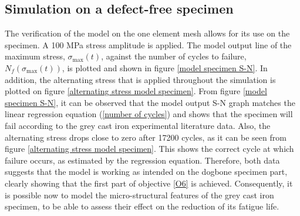 \documentclass[11pt,a4paper]{article}
\begin{document}
\subsection{Simulation on a defect-free specimen}
The verification of the model on the one element mesh allows for its use on the specimen. A 100 MPa stress amplitude is applied. The model output line of the maximum stress,  $\sigma_{\textrm{max}}(t)$,  against the number of cycles to failure, $N_f(\sigma_{\textrm{max}}(t))$, is plotted and shown in figure \ref{model specimen S-N}. In addition, the alternating stress that is applied throughout the simulation is plotted on figure \ref{alternating stress model specimen}. From figure \ref{model specimen S-N}, it can be observed that the model output S-N graph matches the linear regression equation (\ref{number of cycles}) and shows that the specimen will fail according to the grey cast iron experimental literature data. Also, the alternating stress drops close to zero after 17200 cycles, as it can be seen from figure \ref{alternating stress model specimen}. This shows the correct cycle at which failure occurs, as estimated by the regression equation. Therefore, both data suggests that the model is working as intended on the dogbone specimen part, clearly showing that the first part of objective \ref{O6} is achieved. Consequently, it is possible now to model the micro-structural features of the grey cast iron specimen, to be able to assess their effect on the reduction of its fatigue life.
\end{document}
